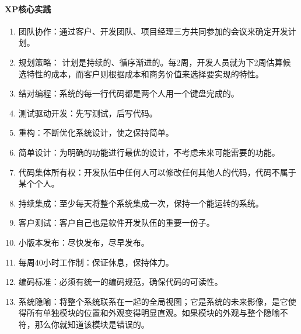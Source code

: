 \documentclass[letterpaper,11pt,english]{sphinxmanual}
\begin{document}
\paragraph{XP核心实践}
\label{\detokenize{chapter_project/Scrum:xp}}\begin{enumerate}
%
\item {} 
团队协作：通过客户、开发团队、项目经理三方共同参加的会议来确定开发计划。

\item {} 
规划策略：
计划是持续的、循序渐进的。每2周，开发人员就为下2周估算候选特性的成本，而客户则根据成本和商务价值来选择要实现的特性。

\item {} 
结对编程：系统的每一行代码都是两个人用一个键盘完成的。

\item {} 
测试驱动开发：先写测试，后写代码。

\item {} 
重构：不断优化系统设计，使之保持简单。

\item {} 
简单设计：为明确的功能进行最优的设计，不考虑未来可能需要的功能。

\item {} 
代码集体所有权：开发队伍中任何人可以修改任何其他人的代码，代码不属于某个个人。

\item {} 
持续集成：至少每天将整个系统集成一次，保持一个能运转的系统。

\item {} 
客户测试：客户自己也是软件开发队伍的重要一份子。

\item {} 
小版本发布：尽快发布，尽早发布。

\item {} 
每周40小时工作制：保证休息，保持体力。

\item {} 
编码标准：必须有统一的编码规范，确保代码的可读性。

\item {} 
系统隐喻：将整个系统联系在一起的全局视图；它是系统的未来影像，是它使得所有单独模块的位置和外观变得明显直观。如果模块的外观与整个隐喻不符，那么你就知道该模块是错误的。
%
\begin{footnote}[741]\sphinxAtStartFootnote
{}
%
\end{footnote}

\end{enumerate}
\end{document}
